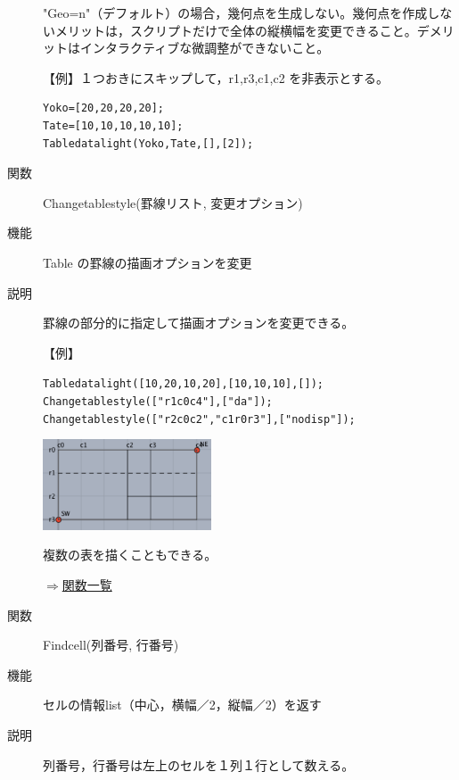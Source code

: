 \documentclass[papersize,a4paper,10pt,uplatex]{jsarticle}
\begin{document}
\begin{description}
\vspace{\baselineskip}
"Geo=n"（デフォルト）の場合，幾何点を生成しない。幾何点を作成しないメリットは，スクリプトだけで全体の縦横幅を変更できること。デメリットはインタラクティブな微調整ができないこと。

\vspace{\baselineskip}
【例】１つおきにスキップして，r1,r3,c1,c2 を非表示とする。
\begin{verbatim}
Yoko=[20,20,20,20];
Tate=[10,10,10,10,10];
Tabledatalight(Yoko,Tate,[],[2]);
\end{verbatim}

\vspace{\baselineskip}
\hypertarget{changetablestyle}{}
\item[関数]Changetablestyle(罫線リスト, 変更オプション)
\item[機能]Table の罫線の描画オプションを変更
\item[説明]罫線の部分的に指定して描画オプションを変更できる。

\vspace{\baselineskip}
【例】

\verb|Tabledatalight([10,20,10,20],[10,10,10],[]);|\\
\verb|Changetablestyle(["r1c0c4"],["da"]);|\\
\verb|Changetablestyle(["r2c0c2","c1r0r3"],["nodisp"]);|

\vspace{\baselineskip}
\hspace{20mm}\includegraphics[bb=0.00 0.00 324.00 174.00,width=50mm]{Fig/changetable.pdf} 

\vspace{\baselineskip}
複数の表を描くこともできる。

\begin{flushright}\hyperlink{functionlist}{$\Rightarrow$関数一覧}\end{flushright}

\vspace{\baselineskip}
\hypertarget{findcell}{}
\item[関数]Findcell(列番号, 行番号)
\item[機能]セルの情報list（中心，横幅／2，縦幅／2）を返す
\item[説明]列番号，行番号は左上のセルを１列１行として数える。


\end{description}
\end{document}
